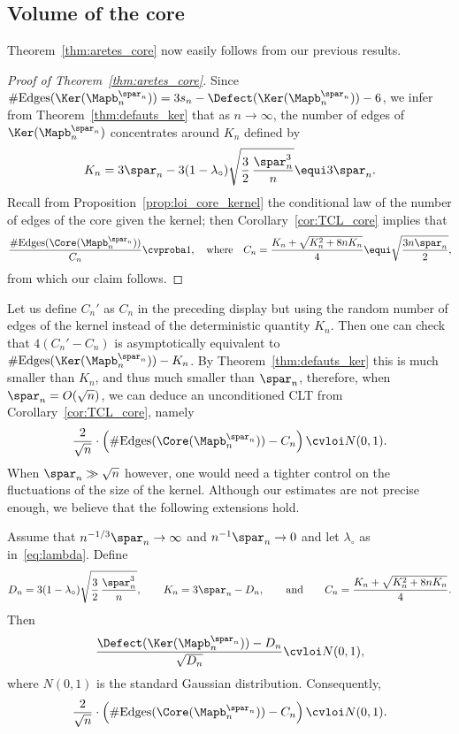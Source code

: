 \subsection{Volume of the core}
\label{ssec:vol_core}

Theorem~\ref{thm:aretes_core} now easily follows from our previous results.

\begin{proof}[Proof of Theorem~\ref{thm:aretes_core}]
Since $\#\mathrm{Edges} (\Ker(\Mapb_n^{\spar_{n}}))=3s_{n}-\Defect(\Ker(\Mapb_n^{\spar_{n}})) -6$, we infer from Theorem~\ref{thm:defauts_ker} that as $n\to\infty$, the number of edges of $\Ker(\Mapb_n^{\spar_{n}})$ concentrates around $K_{n}$ defined by\vspace*{-3pt}
\[
K_n = 3\spar_n - 3 (1-\lambda_{\circ}) \sqrt{\frac{3}{2}\, \frac{\spar_n^3}{n}} \equi 3\spar_n.
\]
Recall from Proposition~\ref{prop:loi_core_kernel} the conditional law of the number of edges of the core given the kernel; then Corollary~\ref{cor:TCL_core} implies that\vspace*{-3pt}
\[
\frac{\#\mathrm{Edges}(\Core(\Mapb_n^{\spar_{n}}))}{C_n} \cvproba 1,
\quad\text{where}\quad
C_n = \frac{K_n + \sqrt{K_n^{2} + 8 n K_n }}{4}
\equi \sqrt{\frac{3 n \spar_n}{2}},
\]
from which our claim follows.
\end{proof}

Let us define $C_n'$ as $C_n$ in the preceding display but using the random number of edges of the kernel instead of the deterministic quantity $K_n$. Then one can check that $4(C_n' - C_n)$ is asymptotically equivalent to $\#\mathrm{Edges}(\Ker(\Mapb_n^{\spar_{n}}))-K_n$. By Theorem~\ref{thm:defauts_ker} this is much smaller than $K_n$, and thus much smaller than $\spar_n$, therefore, when $\spar_n = O(\sqrt{n})$, we can deduce an unconditioned CLT from Corollary~\ref{cor:TCL_core}, namely
\[
\frac{2}{\sqrt{n}} \cdot \left(\#\mathrm{Edges}(\Core(\Mapb_n^{\spar_{n}})) - C_n \right) \cvloi N(0,1).
\]
When $\spar_n \gg \sqrt{n}$ however, one would need a tighter control on the fluctuations of the size of the kernel.
Although our estimates are not precise enough, we believe that the following extensions hold.

\begin{conjecture}\label{conjecture_TCL}
Assume that $n^{-1/3} \spar_n \to \infty$ and $n^{-1} \spar_n \to 0$ and let $\lambda_\circ$ as in~\eqref{eq:lambda}. Define
\[
D_n = 3 (1-\lambda_{\circ}) \sqrt{\frac{3}{2}\, \frac{\spar_n^3}{n}},
\qquad
K_n = 3\spar_n - D_n,
\qquad\text{and}\qquad
C_n = \frac{K_n + \sqrt{K_n^{2} + 8 n K_n }}{4}.
\]
Then
\[
\frac{\Defect(\Ker(\Mapb_n^{\spar_{n}})) - D_n}{\sqrt{D_n}} \cvloi N(0,1),
\]
where $N(0,1)$ is the standard Gaussian distribution. Consequently,
\[
\frac{2}{\sqrt{n}} \cdot \left(\#\mathrm{Edges}(\Core(\Mapb_n^{\spar_{n}})) - C_n \right) \cvloi N(0,1).
\]
\end{conjecture}

